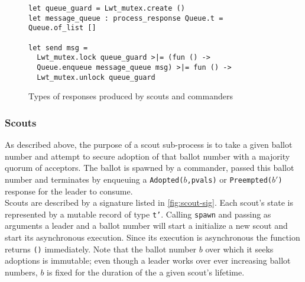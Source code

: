 \begin{figure}
  \begin{lstlisting}
let queue_guard = Lwt_mutex.create ()
let message_queue : process_response Queue.t = Queue.of_list []

let send msg = 
  Lwt_mutex.lock queue_guard >|= (fun () ->
  Queue.enqueue message_queue msg) >|= fun () ->
  Lwt_mutex.unlock queue_guard
  \end{lstlisting}
  \caption{Types of responses produced by scouts and commanders}
  \label{fig:sub-process-messaging-queue}
\end{figure}






\subsubsection{Scouts}

As described above, the purpose of a scout sub-process is to take a given ballot number and attempt to secure adoption of that ballot number with a majority quorum of acceptors. The ballot is spawned by a commander, passed this ballot number and terminates by enqueuing a \texttt{Adopted($b$,pvals)} or \texttt{Preempted($b'$)} response for the leader to consume. \\

Scouts are described by a signature listed in \ref{fig:scout-sig}. Each scout's state is represented by a mutable record of type \texttt{t'}. Calling \texttt{spawn} and passing as arguments a leader and a ballot number will start a initialize a new scout and start its asynchronous execution. Since its execution is asynchronous the function returns \texttt{()} immediately. Note that the ballot number $b$ over which it seeks adoptions is immutable; even though a leader works over ever increasing ballot numbers, $b$ is fixed for the duration of the a given scout's lifetime.  \\

